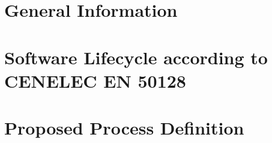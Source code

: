 \documentclass{template/openetcs_article}
\begin{document}

\section{General Information}
\label{sec:general-information}


\section{Software Lifecycle according to CENELEC EN 50128}
\label{sec:sofware-lifecycle}


\section{Proposed  Process Definition}
\label{sec:open-proc-defin}





%

\end{document}
